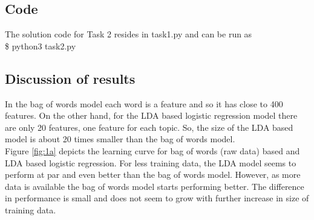 \documentclass[11pt, letterpaper, fleqn]{article}
\begin{document}
\subsection*{Code}
The solution code for Task 2 resides in task1.py and can be run as \\

\$ python3 task2.py


\subsection*{Discussion of results}
In the bag of words model each word is a feature and so it has close to 400 features. On the other hand, for the LDA based logistic regression model there are only 20 features, one feature for each topic. So, the size of the LDA based model is about 20 times smaller than the bag of words model.\\

Figure \ref{fig:1a} depicts the learning curve for bag of words (raw data) based and LDA based logistic regression. For less training data, the LDA model seems to perform at par and even better than the bag of words model. However, as more data is available the bag of words model starts performing better. The difference in performance is small and does not seem to grow with further increase in size of training data. 
\end{document}
